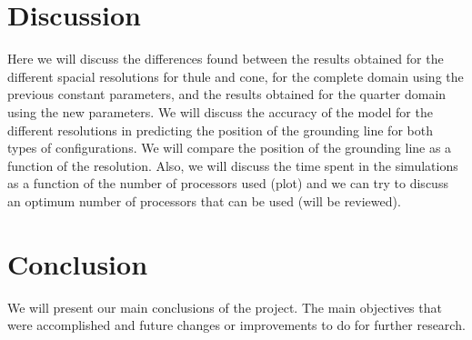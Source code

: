 \documentclass{article}
\begin{document}
\section{Discussion}
Here we will discuss the differences found between the results obtained for the different spacial resolutions for thule and cone, for the complete domain using the previous constant parameters, and the results obtained for the quarter domain using the new parameters. We will discuss the accuracy of the model for the different resolutions in predicting the position of the grounding line for both types of configurations. We will compare the position of the grounding line as a function of the resolution. 
Also, we will discuss the time spent in the simulations as a function of the number of processors used (plot) and we can try to discuss an optimum number of processors that can be used (will be reviewed).
\section{Conclusion}
We will present our main conclusions of the project. The main objectives that were accomplished and future changes or improvements to do for further research.
   \pagebreak

    
    
\end{document}
